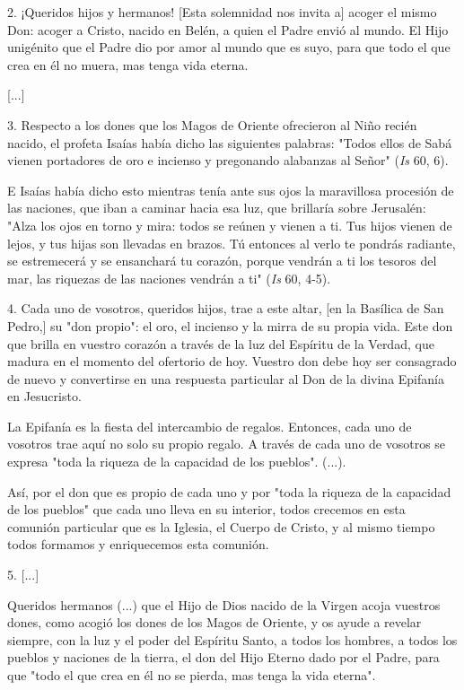 \begin{body}
2. ¡Queridos hijos y hermanos! {[}Esta solemnidad nos invita a{]} acoger el mismo Don: acoger a Cristo, nacido en Belén, a quien el Padre envió al mundo. El Hijo unigénito que el Padre dio por amor al mundo que es suyo, para que todo el que crea en él no muera, mas tenga vida eterna.

{[}...{]}

3. Respecto a los dones que los Magos de Oriente ofrecieron al Niño recién nacido, el profeta Isaías había dicho las siguientes palabras: "Todos ellos de Sabá vienen portadores de oro e incienso y pregonando alabanzas al Señor" (\emph{Is} 60, 6).

E Isaías había dicho esto mientras tenía ante sus ojos la maravillosa procesión de las naciones, que iban a caminar hacia esa luz, que brillaría sobre Jerusalén: "Alza los ojos en torno y mira: todos se reúnen y vienen a ti. Tus hijos vienen de lejos, y tus hijas son llevadas en brazos. Tú entonces al verlo te pondrás radiante, se estremecerá y se ensanchará tu corazón, porque vendrán a ti los tesoros del mar, las riquezas de las naciones vendrán a ti" (\emph{Is} 60, 4-5).

4. Cada uno de vosotros, queridos hijos, trae a este altar, {[}en la Basílica de San Pedro,{]} su "don propio": el oro, el incienso y la mirra de su propia vida. Este don que brilla en vuestro corazón a través de la luz del Espíritu de la Verdad, que madura en el momento del ofertorio de hoy. Vuestro don debe hoy ser consagrado de nuevo y convertirse en una respuesta particular al Don de la divina Epifanía en Jesucristo.

La Epifanía es la fiesta del intercambio de regalos. Entonces, cada uno de vosotros trae aquí no solo su propio regalo. A través de cada uno de vosotros se expresa "toda la riqueza de la capacidad de los pueblos". (...).

Así, por el don que es propio de cada uno y por "toda la riqueza de la capacidad de los pueblos" que cada uno lleva en su interior, todos crecemos en esta comunión particular que es la Iglesia, el Cuerpo de Cristo, y al mismo tiempo todos formamos y enriquecemos esta comunión.

5. {[}...{]}

Queridos hermanos (...) que el Hijo de Dios nacido de la Virgen acoja vuestros dones, como acogió los dones de los Magos de Oriente, y os ayude a revelar siempre, con la luz y el poder del Espíritu Santo, a todos los hombres, a todos los pueblos y naciones de la tierra, el don del Hijo Eterno dado por el Padre, para que "todo el que crea en él no se pierda, mas tenga la vida eterna".


\end{body}
